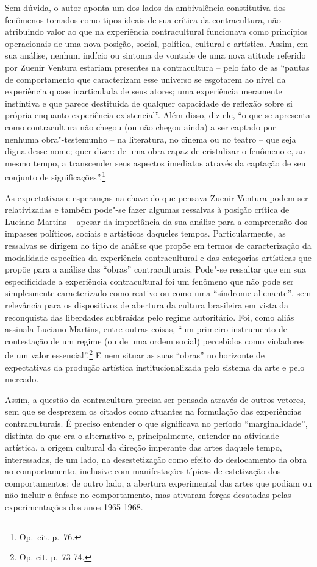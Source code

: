 Sem dúvida, o autor aponta um dos lados da ambivalência constitutiva dos
fenômenos tomados como tipos ideais de sua crítica da contracultura, não
atribuindo valor ao que na experiência contracultural funcionava como
princípios operacionais de uma nova posição, social, política, cultural
e artística. Assim, em sua análise, nenhum indício ou sintoma de vontade
de uma nova atitude referido por Zuenir Ventura estariam presentes na
contracultura -- pelo fato de as ``pautas de comportamento que
caracterizam esse universo se esgotarem ao nível da experiência quase
inarticulada de seus atores; uma experiência meramente instintiva e que
parece destituída de qualquer capacidade de reflexão sobre si própria
enquanto experiência existencial''. Além disso, diz ele, ``o que se
apresenta como contracultura não chegou (ou não chegou ainda) a ser
captado por nenhuma obra"-testemunho -- na literatura, no cinema ou no
teatro -- que seja digna desse nome; quer dizer: de uma obra capaz de
cristalizar o fenômeno e, ao mesmo tempo, a transcender seus aspectos
imediatos através da captação de seu conjunto de
significações''.\footnote{Op.~cit. p.~76.}

As expectativas e esperanças na chave do que pensava Zuenir Ventura
podem ser relativizadas e também pode"-se fazer algumas ressalvas à
posição crítica de Luciano Martins -- apesar da importância da sua
análise para a compreensão dos impasses políticos, sociais e artísticos
daqueles tempos. Particularmente, as ressalvas se dirigem ao tipo de
análise que propõe em termos de caracterização da modalidade específica
da experiência contracultural e das categorias artísticas que propõe
para a análise das ``obras'' contraculturais. Pode"-se ressaltar que em
sua especificidade a experiência contracultural foi um fenômeno que não
pode ser simplesmente caracterizado como reativo ou como uma ``síndrome
alienante'', sem relevância para os dispositivos de abertura da cultura
brasileira em vista da reconquista das liberdades subtraídas pelo regime
autoritário. Foi, como aliás assinala Luciano Martins, entre outras
coisas, ``um primeiro instrumento de contestação de um regime (ou de uma
ordem social) percebidos como violadores de um valor
essencial''.\footnote{Op. cit. p.~73-74.} E nem situar as suas ``obras''
no horizonte de expectativas da produção artística institucionalizada
pelo sistema da arte e pelo mercado.

Assim, a questão da contracultura precisa ser pensada através de outros
vetores, sem que se desprezem os citados como atuantes na formulação das
experiências contraculturais. É preciso entender o que significava no
período ``marginalidade'', distinta do que era o alternativo e,
principalmente, entender na atividade artística, a origem cultural da
direção imperante das artes daquele tempo, interessadas, de um lado, na
desestetização como efeito do deslocamento da obra ao comportamento,
inclusive com manifestações típicas de estetização dos comportamentos;
de outro lado, a abertura experimental das artes que podiam ou não
incluir a ênfase no comportamento, mas ativaram forças desatadas pelas
experimentações dos anos 1965-1968.

